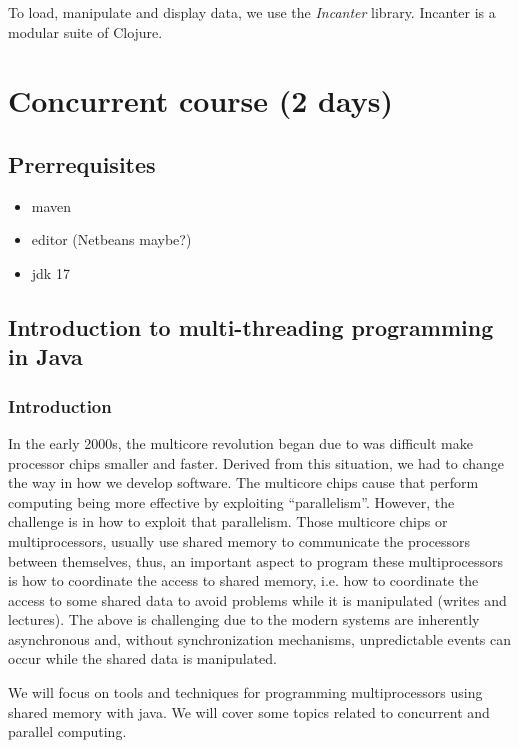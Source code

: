 \documentclass[openany, a4paper]{book}
\theoremstyle{break}
\theoremstyle{example}
\theoremstyle{note}
\theoremstyle{break}
\theoremstyle{exercise}
\begin{document}
To load, manipulate and display data, we use the \emph{Incanter} library. Incanter
is a modular suite of Clojure.


\chapter{Concurrent course (2 days)}
\label{sec:org59a73f3}

\section{Prerrequisites}
\label{sec:org7a0004e}
\begin{itemize}
\item maven
\item editor (Netbeans maybe?)
\item jdk 17
\end{itemize}


\section{Introduction to multi-threading programming in Java}
\label{sec:org7198cdc}

\subsection{Introduction}
\label{sec:org76637e8}

In the early 2000s, the multicore revolution began due to was difficult make
processor chips smaller and faster. Derived from this situation, we had to
change the way in how we develop software. The multicore chips cause that
perform computing being more effective by exploiting
``parallelism''. However, the challenge is in how to exploit that
parallelism. Those multicore chips or multiprocessors, usually use shared
memory to communicate the processors between themselves, thus, an important
aspect to program these multiprocessors is how to coordinate the access to
shared memory, i.e. how to coordinate the access to some shared data to avoid
problems while it is manipulated (writes and lectures). The above is
challenging due to the modern systems are inherently asynchronous and,
without synchronization mechanisms, unpredictable events can occur while the
shared data is manipulated.

We will focus on tools and techniques for programming multiprocessors using
shared memory with java. We will cover some topics related to concurrent and
parallel computing.
\end{document}

